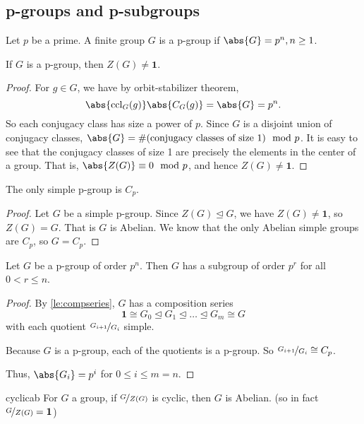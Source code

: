 \subsection{p-groups and p-subgroups}
\leavevmode
\begin{definition}{}{}
    Let \(p\) be a prime. A finite group \(G\) is a p-group if \(\abs{G} = p^n, n\geq 1\).
\end{definition}
\begin{theorem}{}{}
    If \(G\) is a p-group, then \(Z(G) \neq \textbf{1} \).
\end{theorem}
\begin{proof}
    For \(g \in G\), we have by orbit-stabilizer theorem,
    \[\abs{\mathrm{ccl}_G(g)} \abs{C_G(g)} = \abs{G} = p^n.\] 
    So each conjugacy class has size a power of \(p\). Since \(G\) is a disjoint union of conjugacy classes, \(\abs{G}= \# (\text{conjugacy classes of size 1})\mod p\). It is easy to see that the conjugacy classes of size 1 are precisely the elements in the center of a group. That is, \(\abs{Z(G)} \equiv 0 \mod p  \), and hence \(Z(G) \neq \textbf{1}\).
\end{proof}
\begin{corollary}{}{}
    The only simple p-group is \(C_p\).
\end{corollary}
\begin{proof}
    Let \(G\) be a simple p-group. Since \(Z(G) \trianglelefteq G\), we have \(Z(G) \neq \textbf{1} \), so \(Z(G) = G\). That is \(G\) is Abelian. We know that the only Abelian simple groups are \(C_p\), so \(G = C_p\).
\end{proof}
\begin{corollary}{}{}
    Let \(G\) be a p-group of order \(p^n\). Then \(G\) has a subgroup of order \(p^r\) for all \(0 < r \leq n\).
\end{corollary}
\begin{proof}
    By \cref{le:compseries}, \(G\) has a composition series
    \[
        \textbf{1} \cong G_0 \trianglelefteq G_1 \trianglelefteq \ldots \trianglelefteq G_m \cong G
    \]
    with each quotient \(\nicefrac{G_{i+1}}{G_{i}}\) simple.
    
    Because \(G\) is a p-group, each of the quotients is a p-group. So \(\nicefrac{G_{i+1}}{G_i}\cong C_p\).

    Thus, \(\abs{G_i} =p^i\) for \(0\leq i \leq m = n\).
\end{proof}
\begin{lemma}{}{cyclicab}
    For \(G\) a group, if \(\nicefrac{G}{Z(G)}\) is cyclic, then \(G\) is Abelian. (so in fact \(\nicefrac{G}{Z(G)} = \textbf{1} \))
\end{lemma}
